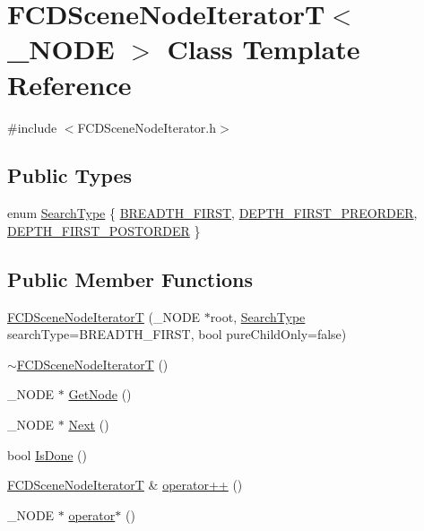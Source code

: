 \hypertarget{classFCDSceneNodeIteratorT}{
\section{FCDSceneNodeIteratorT$<$ \_\-NODE $>$ Class Template Reference}
\label{classFCDSceneNodeIteratorT}
}


{\ttfamily \#include $<$FCDSceneNodeIterator.h$>$}

\subsection*{Public Types}
\begin{DoxyCompactItemize}
\item 
enum \hyperlink{classFCDSceneNodeIteratorT_aa4caf69a5959db0fa82e3d25e8b56367}{SearchType} \{ \hyperlink{classFCDSceneNodeIteratorT_aa4caf69a5959db0fa82e3d25e8b56367a4a40ecf50eeb28d5adf02fc8f55550be}{BREADTH\_\-FIRST}, 
\hyperlink{classFCDSceneNodeIteratorT_aa4caf69a5959db0fa82e3d25e8b56367a5ad049a76b27b906ce1389609106229c}{DEPTH\_\-FIRST\_\-PREORDER}, 
\hyperlink{classFCDSceneNodeIteratorT_aa4caf69a5959db0fa82e3d25e8b56367af674b6b62e2e3a67ca888a94b058aeff}{DEPTH\_\-FIRST\_\-POSTORDER}
 \}
\end{DoxyCompactItemize}
\subsection*{Public Member Functions}
\begin{DoxyCompactItemize}
\item 
\hyperlink{classFCDSceneNodeIteratorT_a1e0908d914e1b8c5b452a9816771b0ed}{FCDSceneNodeIteratorT} (\_\-NODE $\ast$root, \hyperlink{classFCDSceneNodeIteratorT_aa4caf69a5959db0fa82e3d25e8b56367}{SearchType} searchType=BREADTH\_\-FIRST, bool pureChildOnly=false)
\item 
\hyperlink{classFCDSceneNodeIteratorT_aa6b60e205b694c0293a3a1dd6f3c746a}{$\sim$FCDSceneNodeIteratorT} ()
\item 
\_\-NODE $\ast$ \hyperlink{classFCDSceneNodeIteratorT_a276fdda452c3fd746f71e02ba998f895}{GetNode} ()
\item 
\_\-NODE $\ast$ \hyperlink{classFCDSceneNodeIteratorT_a0deb5e4e9954390865cde455984ec302}{Next} ()
\item 
bool \hyperlink{classFCDSceneNodeIteratorT_a0ab7b88852e0deabc35177c3aa15e9a8}{IsDone} ()
\item 
\hyperlink{classFCDSceneNodeIteratorT}{FCDSceneNodeIteratorT} \& \hyperlink{classFCDSceneNodeIteratorT_a83648440e727233e9fc9e9d8fee1d7af}{operator++} ()
\item 
\_\-NODE $\ast$ \hyperlink{classFCDSceneNodeIteratorT_aba0c9dbfb98e55ced477f06131c9dce8}{operator$\ast$} ()
\end{DoxyCompactItemize}



